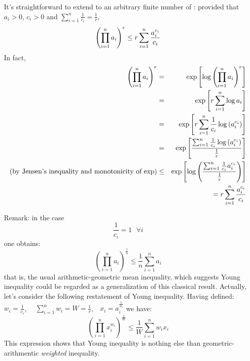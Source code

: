 \documentclass[12pt]{article}
\begin{document}
It's straightforward to extend 
to an arbitrary finite number of : provided that $%
a_{i}>0$, $c_{i}>0$ and $\sum_{i=1}^{n}\frac{1}{c_{i}}=\frac{1}{r}$, 
\[
\left( \prod_{i=1}^{n}a_{i}\right) ^{r}\leq r\sum_{i=1}^{n}\frac{%
a_{i}^{c_{i}}}{c_{i}}
\]%
In fact, 
\begin{eqnarray*}
\left( \prod_{i=1}^{n}a_{i}\right) ^{r} &=&\exp \left[ \log \left(
\prod_{i=1}^{n}a_{i}\right) ^{r}\right]  \\
&=&\exp \left[ r\sum_{i=1}^{n}\log a_{i}\right]  \\
&=&\exp \left[ r\sum_{i=1}^{n}\frac{1}{c_{i}}\log \left( a_{i}^{c_{i}}\right)
\right]  \\
&=&\exp \left[ \frac{\sum_{i=1}^{n}\frac{1}{c_{i}}\log \left( a_{i}^{c_{i}}\right)
}{\frac{1}{r}}\right]  \\
\text{(by Jensen's inequality and monotonicity of exp)} &\leq &\exp \left[ \log \left( \frac{%
\sum_{i=1}^{n}\frac{1}{c_{i}}a_{i}^{c_{i}}}{\frac{1}{r}}\right) \right]  \\
&&=r\sum_{i=1}^{n}\frac{a_{i}^{c_{i}}}{c_{i}}
\end{eqnarray*}

\bigskip 

Remark: in the case 
\[
\frac{1}{c_{i}}=1\text{ \ \ \ \ }\forall i
\]
one obtains:%
\[
\left( \prod_{i=1}^{n}a_{i}\right) ^{\frac{1}{n}}\leq \frac{1}{n}%
\sum_{i=1}^{n}a_{i}
\]
that is, the usual arithmetic-geometric mean inequality, which suggests
Young inequality could be regarded as a generalization of this classical result.
Actually, let's consider the following restatement of
Young inequality. Having defined:
$w_{i}=\frac{1}{c_{i}}$, \ $\ \ \sum_{i=1}^{n}w_{i}=W=\frac{1}{r}$, 
$\ \ \ x_{i}=a_{i}^{\frac{1}{w_{i}}}$
we have:
\[
\left( \prod_{i=1}^{n}x_{i}^{w_{i}}\right) ^{\frac{1}{W}}\leq \frac{1}{W}%
\sum_{i=1}^{n}w_{i}x_{i}
\]
This expression shows that Young inequality is nothing else than
geometric-arithmentic \textit{weighted}  inequality.
\end{document}
